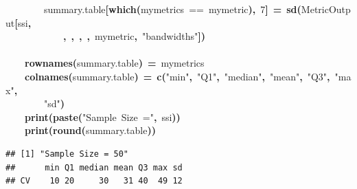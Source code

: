 \documentclass{article}
\makeatletter
\newcommand{\hlnumber}[1]{\textcolor[rgb]{0,0,0}{#1}}%
\newcommand{\hlfunctioncall}[1]{\textcolor[rgb]{0.501960784313725,0,0.329411764705882}{\textbf{#1}}}%
\newcommand{\hlstring}[1]{\textcolor[rgb]{0.6,0.6,1}{#1}}%
\newcommand{\hlkeyword}[1]{\textcolor[rgb]{0,0,0}{\textbf{#1}}}%
\newcommand{\hlassignement}[1]{\textcolor[rgb]{0,0,0}{\textbf{#1}}}%
\newcommand{\hlsymbol}[1]{\textcolor[rgb]{0,0,0}{#1}}%
\newcommand{\hlstd}[1]{\textcolor[rgb]{0,0,0}{#1}}%
\newenvironment{kframe}{%
 \def\FrameCommand##1{\hskip\@totalleftmargin \hskip-\fboxsep
 \colorbox{shadecolor}{##1}\hskip-\fboxsep
     \hskip-\linewidth \hskip-\@totalleftmargin \hskip\columnwidth}%
 \MakeFramed {\advance\hsize-\width
   \@totalleftmargin\z@ \linewidth\hsize
   \@setminipage}}%
 {\par\unskip\endMakeFramed}
\newenvironment{knitrout}{}{} %
\makeatother
\begin{document}
\begin{knitrout}
\begin{kframe}
\begin{flushleft}
\hlstd{}{\ }{\ }{\ }{\ }{\ }{\ }{\ }{\ }\hlsymbol{summary.table}\hlkeyword{[}\hlfunctioncall{which}\hlkeyword{(}\hlsymbol{mymetrics}{\ }=={\ }\hlsymbol{mymetric}\hlkeyword{)}\hlkeyword{,}{\ }\hlnumber{7}\hlkeyword{]}{\ }\hlassignement{=}{\ }\hlfunctioncall{sd}\hlkeyword{(}\hlsymbol{MetricOutput}\hlkeyword{[}\hlsymbol{ssi}\hlkeyword{,}\hspace*{\fill}\\
\hlstd{}{\ }{\ }{\ }{\ }{\ }{\ }{\ }{\ }{\ }{\ }{\ }{\ }\hlkeyword{,}{\ }\hlkeyword{,}{\ }\hlkeyword{,}{\ }\hlkeyword{,}{\ }\hlsymbol{mymetric}\hlkeyword{,}{\ }\hlstring{"{}bandwidths"{}}\hlkeyword{]}\hlkeyword{)}\hspace*{\fill}\\
\hlstd{}{\ }{\ }{\ }{\ }\hlkeyword{\usebox{\hlnormalsizeboxclosebrace}}\hspace*{\fill}\\
\hlstd{}{\ }{\ }{\ }{\ }\hlfunctioncall{rownames}\hlkeyword{(}\hlsymbol{summary.table}\hlkeyword{)}{\ }\hlassignement{=}{\ }\hlsymbol{mymetrics}\hspace*{\fill}\\
\hlstd{}{\ }{\ }{\ }{\ }\hlfunctioncall{colnames}\hlkeyword{(}\hlsymbol{summary.table}\hlkeyword{)}{\ }\hlassignement{=}{\ }\hlfunctioncall{c}\hlkeyword{(}\hlstring{"{}min"{}}\hlkeyword{,}{\ }\hlstring{"{}Q1"{}}\hlkeyword{,}{\ }\hlstring{"{}median"{}}\hlkeyword{,}{\ }\hlstring{"{}mean"{}}\hlkeyword{,}{\ }\hlstring{"{}Q3"{}}\hlkeyword{,}{\ }\hlstring{"{}max"{}}\hlkeyword{,}\hspace*{\fill}\\
\hlstd{}{\ }{\ }{\ }{\ }{\ }{\ }{\ }{\ }\hlstring{"{}sd"{}}\hlkeyword{)}\hspace*{\fill}\\
\hlstd{}{\ }{\ }{\ }{\ }\hlfunctioncall{print}\hlkeyword{(}\hlfunctioncall{paste}\hlkeyword{(}\hlstring{"{}Sample{\ }Size{\ }="{}}\hlkeyword{,}{\ }\hlsymbol{ssi}\hlkeyword{)}\hlkeyword{)}\hspace*{\fill}\\
\hlstd{}{\ }{\ }{\ }{\ }\hlfunctioncall{print}\hlkeyword{(}\hlfunctioncall{round}\hlkeyword{(}\hlsymbol{summary.table}\hlkeyword{)}\hlkeyword{)}\hspace*{\fill}\\
\hlstd{}\hlkeyword{\usebox{\hlnormalsizeboxclosebrace}}\mbox{}
\normalfont
\end{flushleft}
\begin{verbatim}
## [1] "Sample Size = 50"
##      min Q1 median mean Q3 max sd
## CV    10 20     30   31 40  49 12

\end{verbatim}
\end{kframe}
\end{knitrout}
\end{document}

